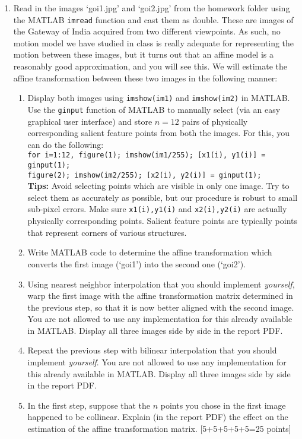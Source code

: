\documentclass[11pt]{article}
\begin{document}
\begin{enumerate}
\item Read in the images `goi1.jpg' and `goi2.jpg' from the homework folder using the MATLAB \texttt{imread} function and cast them as double. These are images of the Gateway of India acquired from two different viewpoints. As such, no motion model we have studied in class is really adequate for representing the motion between these images, but it turns out that an affine model is a reasonably good approximation, and you will see this. We will estimate the affine transformation between these two images in the following manner:
\begin{enumerate}
\item Display both images using \texttt{imshow(im1)} and \texttt{imshow(im2)} in MATLAB. Use the \texttt{ginput} function of MATLAB to manually select (via an easy graphical user interface) and store $n = 12$ pairs of physically corresponding salient feature points from both the images. For this, you can do the following: \\
\texttt{for i=1:12, figure(1); imshow(im1/255); [x1(i), y1(i)] = ginput(1); \\ figure(2); imshow(im2/255); [x2(i), y2(i)] = ginput(1);}\\
\textbf{Tips:} Avoid selecting points which are visible in only one image. Try to select them as accurately as possible, but our procedure is robust to small sub-pixel errors. Make sure \texttt{x1(i),y1(i)} and \texttt{x2(i),y2(i)} are actually physically corresponding points. Salient feature points are typically points that represent corners of various structures. 
\item Write MATLAB code to determine the affine transformation which converts the first image (`goi1') into the second one (`goi2'). 
\item Using nearest neighbor interpolation that you should implement \emph{yourself}, warp the first image with the affine transformation matrix determined in the previous step, so that it is now better aligned with the second image. You are not allowed to use any implementation for this already available in MATLAB. Display all three images side by side in the report PDF.
\item Repeat the previous step with bilinear interpolation that you should implement \emph{yourself}. You are not allowed to use any implementation for this already available in MATLAB. Display all three images side by side in the report PDF.
\item In the first step, suppose that the $n$ points you chose in the first image happened to be collinear. Explain (in the report PDF) the effect on the estimation of the affine transformation matrix. 
\textsf{[5+5+5+5+5=25 points]}
\end{enumerate}


\end{enumerate}
\end{document}
